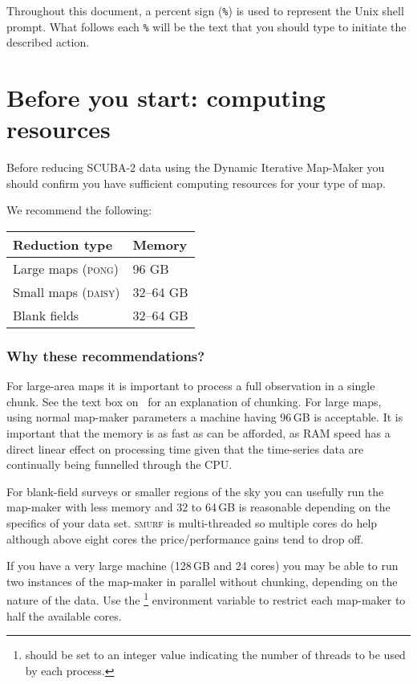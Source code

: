 Throughout this document, a percent sign (\texttt{\%}) is used to
represent the Unix shell prompt. What follows each \texttt{\%} will be
the text that you should type to initiate the described action.

\section{ Before you start: computing resources}
\label{sec:computing}

Before reducing SCUBA-2 data using the Dynamic Iterative Map-Maker you should confirm you have
sufficient computing resources for your type of map.

We recommend the following:
\begin{table}[h!]
  \centering
  \begin{tabular}{ll}
    \hline
    \textbf{Reduction type} &\textbf{Memory} \\
    \hline
    Large maps (\textsc{pong})& 96 GB\\
    Small maps (\textsc{daisy})&32--64 GB\\
    Blank fields&32--64 GB\\
    \hline
  \end{tabular}
\end{table}

\subsubsection*{Why these recommendations?}

For large-area maps it is important to process a full observation in a
single chunk. See the text box on
\ for
an explanation of chunking. For large maps, using normal map-maker
parameters a machine having 96\,GB is acceptable. It is important that
the memory is as fast as can be afforded, as RAM speed has a direct
linear effect on processing time given that the time-series data are
continually being funnelled through the CPU.

For blank-field surveys or smaller
regions of the sky you can usefully run the map-maker with less memory
and 32 to 64\,GB is reasonable depending on the specifics of your data
set. \textsc{smurf} is multi-threaded so multiple cores do help
although above eight cores the price/performance gains tend to drop
off.

If you have a very large machine (128\,GB and 24 cores) you may be able
to run two instances of the map-maker in parallel without chunking,
depending on the nature of the data. Use
the \footnote{ should be
set to an integer value indicating the number of threads to be used by
each process.} environment variable to restrict each map-maker to half
the available cores.

